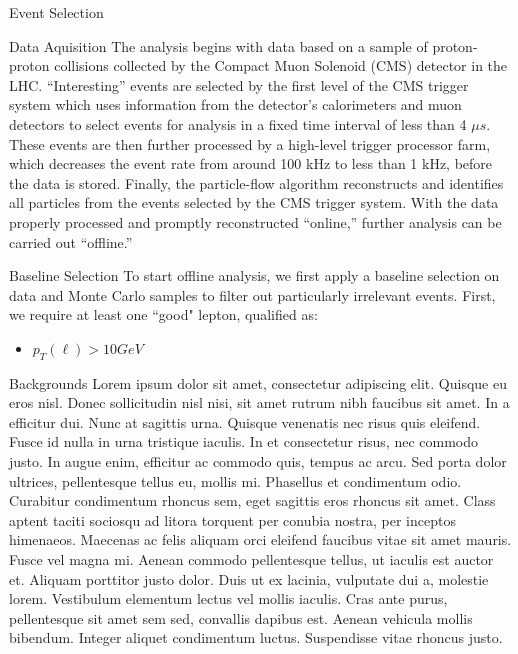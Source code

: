 \begin{section}{Event Selection}
\begin{subsection}{Data Aquisition}
The analysis begins with data based on a sample of proton-proton collisions collected by the Compact Muon Solenoid (CMS) detector in the LHC. ``Interesting'' events are selected by the first level of the CMS trigger system which uses information from the detector's calorimeters and muon detectors to select events for analysis in a fixed time interval of less than 4 $\mu s$. These events are then further processed by a high-level trigger processor farm, which decreases the event rate from around 100 kHz to less than 1 kHz, before the data is stored. Finally, the particle-flow algorithm reconstructs and identifies all particles from the events selected by the CMS trigger system. With the data properly processed and promptly reconstructed ``online,'' further analysis can be carried out ``offline.''
\end{subsection}
\begin{subsection}{Baseline Selection}
To start offline analysis, we first apply a baseline selection on data and Monte Carlo samples to filter out particularly irrelevant events. First, we require at least one ``good" lepton, qualified as:
\begin{itemize}
    \item $p_{T}(\ell) > 10 GeV$
\end{itemize}

\end{subsection}
\end{section}

\begin{section}{Backgrounds}
Lorem ipsum dolor sit amet, consectetur adipiscing elit. Quisque eu eros nisl. Donec sollicitudin nisl nisi, sit amet rutrum nibh faucibus sit amet. In a efficitur dui. Nunc at sagittis urna. Quisque venenatis nec risus quis eleifend. Fusce id nulla in urna tristique iaculis. In et consectetur risus, nec commodo justo. In augue enim, efficitur ac commodo quis, tempus ac arcu. Sed porta dolor ultrices, pellentesque tellus eu, mollis mi. Phasellus et condimentum odio. Curabitur condimentum rhoncus sem, eget sagittis eros rhoncus sit amet. Class aptent taciti sociosqu ad litora torquent per conubia nostra, per inceptos himenaeos. Maecenas ac felis aliquam orci eleifend faucibus vitae sit amet mauris. Fusce vel magna mi. Aenean commodo pellentesque tellus, ut iaculis est auctor et.
Aliquam porttitor justo dolor. Duis ut ex lacinia, vulputate dui a, molestie lorem. Vestibulum elementum lectus vel mollis iaculis. Cras ante purus, pellentesque sit amet sem sed, convallis dapibus est. Aenean vehicula mollis bibendum. Integer aliquet condimentum luctus. Suspendisse vitae rhoncus justo.
\end{section}

